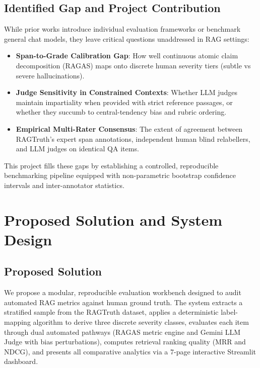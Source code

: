 \documentclass[11pt,a4paper]{article}
\begin{document}
\subsection{Identified Gap and Project Contribution}
While prior works introduce individual evaluation frameworks or benchmark general chat models, they leave critical questions unaddressed in RAG settings:
\begin{itemize}[leftmargin=*]
    \item \textbf{Span-to-Grade Calibration Gap}: How well continuous atomic claim decomposition (RAGAS) maps onto discrete human severity tiers (subtle vs severe hallucinations).
    \item \textbf{Judge Sensitivity in Constrained Contexts}: Whether LLM judges maintain impartiality when provided with strict reference passages, or whether they succumb to central-tendency bias and rubric ordering.
    \item \textbf{Empirical Multi-Rater Consensus}: The extent of agreement between RAGTruth's expert span annotations, independent human blind relabellers, and LLM judges on identical QA items.
\end{itemize}

This project fills these gaps by establishing a controlled, reproducible benchmarking pipeline equipped with non-parametric bootstrap confidence intervals and inter-annotator statistics.

\section{Proposed Solution and System Design}

\subsection{Proposed Solution}
We propose a modular, reproducible evaluation workbench designed to audit automated RAG metrics against human ground truth. The system extracts a stratified sample from the RAGTruth dataset, applies a deterministic label-mapping algorithm to derive three discrete severity classes, evaluates each item through dual automated pathways (RAGAS metric engine and Gemini LLM Judge with bias perturbations), computes retrieval ranking quality (MRR and NDCG), and presents all comparative analytics via a 7-page interactive Streamlit dashboard.
\end{document}
